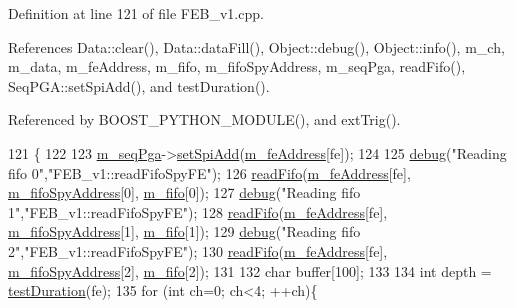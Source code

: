 Definition at line 121 of file F\+E\+B\+\_\+v1.\+cpp.



References Data\+::clear(), Data\+::data\+Fill(), Object\+::debug(), Object\+::info(), m\+\_\+ch, m\+\_\+data, m\+\_\+fe\+Address, m\+\_\+fifo, m\+\_\+fifo\+Spy\+Address, m\+\_\+seq\+Pga, read\+Fifo(), Seq\+P\+G\+A\+::set\+Spi\+Add(), and test\+Duration().



Referenced by B\+O\+O\+S\+T\+\_\+\+P\+Y\+T\+H\+O\+N\+\_\+\+M\+O\+D\+U\+L\+E(), and ext\+Trig().


\begin{DoxyCode}
121                                              \{
122    
123   \hyperlink{classFEB__v1_a6c7804ac86796f233a8393043adf2e77}{m\_seqPga}->\hyperlink{classSeqPGA_ac998ce3a6d9b5f2e88cc8393f8c1df53}{setSpiAdd}(\hyperlink{classFEB__v1_a4e1945c2d5b434125f375e9d0fc6d99f}{m\_feAddress}[fe]);
124 
125   \hyperlink{classObject_aac010553f022165573714b7014a15f0d}{debug}(\textcolor{stringliteral}{"Reading fifo 0"},\textcolor{stringliteral}{"FEB\_v1::readFifoSpyFE"});
126   \hyperlink{classFEB__v1_af945f99a912c5ad076ebdb03dbb6c139}{readFifo}(\hyperlink{classFEB__v1_a4e1945c2d5b434125f375e9d0fc6d99f}{m\_feAddress}[fe], \hyperlink{classFEB__v1_a15b48648ba4534e732376b68bddc5d34}{m\_fifoSpyAddress}[0], 
      \hyperlink{classFEB__v1_ae5b770f2f5ffb97324862c93e3153985}{m\_fifo}[0]);
127   \hyperlink{classObject_aac010553f022165573714b7014a15f0d}{debug}(\textcolor{stringliteral}{"Reading fifo 1"},\textcolor{stringliteral}{"FEB\_v1::readFifoSpyFE"});
128   \hyperlink{classFEB__v1_af945f99a912c5ad076ebdb03dbb6c139}{readFifo}(\hyperlink{classFEB__v1_a4e1945c2d5b434125f375e9d0fc6d99f}{m\_feAddress}[fe], \hyperlink{classFEB__v1_a15b48648ba4534e732376b68bddc5d34}{m\_fifoSpyAddress}[1], 
      \hyperlink{classFEB__v1_ae5b770f2f5ffb97324862c93e3153985}{m\_fifo}[1]);
129   \hyperlink{classObject_aac010553f022165573714b7014a15f0d}{debug}(\textcolor{stringliteral}{"Reading fifo 2"},\textcolor{stringliteral}{"FEB\_v1::readFifoSpyFE"});
130   \hyperlink{classFEB__v1_af945f99a912c5ad076ebdb03dbb6c139}{readFifo}(\hyperlink{classFEB__v1_a4e1945c2d5b434125f375e9d0fc6d99f}{m\_feAddress}[fe], \hyperlink{classFEB__v1_a15b48648ba4534e732376b68bddc5d34}{m\_fifoSpyAddress}[2], 
      \hyperlink{classFEB__v1_ae5b770f2f5ffb97324862c93e3153985}{m\_fifo}[2]);
131   
132   \textcolor{keywordtype}{char} buffer[100];
133   
134   \textcolor{keywordtype}{int} depth = \hyperlink{classFEB__v1_a7f1db8ca9490172fce7603da9e703dec}{testDuration}(fe);
135   \textcolor{keywordflow}{for} (\textcolor{keywordtype}{int} ch=0; ch<4; ++ch)\{

\end{DoxyCode}
